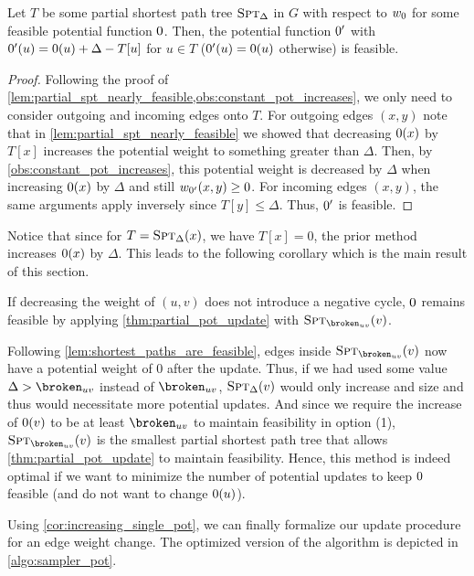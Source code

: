 \begin{theorem}\label{thm:partial_pot_update}
  Let $T$ be some partial shortest path tree $\textsc{Spt}_{\Delta}$ in $G$ with respect to $\wpot$ for some feasible potential function $\pot$.
  Then, the potential function $\pot'$ with $\pot'(u) = \pot(u) + \Delta - T[u]$ for $u \in T$ ($\pot'(u) = \pot(u)$ otherwise) is feasible.
\end{theorem}
\begin{proof}
  Following the proof of \cref{lem:partial_spt_nearly_feasible,obs:constant_pot_increases}, we only need to consider outgoing and incoming edges onto $T$.
  For outgoing edges $(x, y)$ note that in \cref{lem:partial_spt_nearly_feasible} we showed that decreasing $\pot(x)$ by $T[x]$ increases the potential weight to something greater than $\Delta$.
  Then, by \cref{obs:constant_pot_increases}, this potential weight is decreased by $\Delta$ when increasing $\pot(x)$ by $\Delta$ and still $w_{\pot'}(x, y) \geq 0$.
  For incoming edges $(x, y)$, the same arguments apply inversely since $T[y] \leq \Delta$.
  Thus, $\pot'$ is feasible.
\end{proof}

\noindent Notice that since for $T = \textsc{Spt}_{\Delta}(x)$, we have $T[x] = 0$, the prior method increases $\pot(x)$ by $\Delta$.
This leads to the following corollary which is the main result of this section.

\begin{corollary}\label{cor:increasing_single_pot}
  If decreasing the weight of $(u,v)$ does not introduce a negative cycle, $\pot$ remains feasible by applying \cref{thm:partial_pot_update} with $\pspt{\brokuv}(v)$.
\end{corollary}

Following \cref{lem:shortest_paths_are_feasible}, edges inside $\pspt{\brokuv}(v)$ now have a potential weight of $0$ after the update.
Thus, if we had used some value $\Delta > \brokuv$ instead of $\brokuv$, $\textsc{Spt}_{\Delta}(v)$ would only increase and size and thus would necessitate more potential updates.
And since we require the increase of $\pot(v)$ to be at least $\brokuv$ to maintain feasibility in option (1), $\pspt{\brokuv}(v)$ is the smallest partial shortest path tree that allows \cref{thm:partial_pot_update} to maintain feasibility.
Hence, this method is indeed optimal if we want to minimize the number of potential updates to keep $\pot$ feasible (and do not want to change $\pot(u)$).

Using \cref{cor:increasing_single_pot}, we can finally formalize our update procedure for an edge weight change.
The optimized version of the algorithm is depicted in \cref{algo:sampler_pot}.

